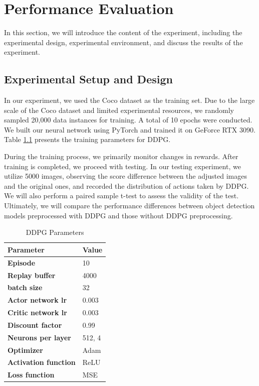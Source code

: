 \documentclass{PHlab-thesis}
\begin{document}
\chapter{Performance Evaluation}
In this section, we will introduce the content of the experiment, including the experimental design, experimental environment, and discuss the results of the experiment.

\section{Experimental Setup and Design}
In our experiment, we used the Coco dataset \cite{lin2014microsoft} as the training set. Due to the large scale of the Coco dataset and limited experimental resources, we randomly sampled 20,000 data instances for training. A total of 10 epochs were conducted. We built our neural network using PyTorch and trained it on GeForce RTX 3090. Table \ref{Fig.DDPG parameter} presents the training parameters for DDPG.

During the training process, we primarily monitor changes in rewards. After training is completed, we proceed with testing. In our testing experiment, we utilize 5000 images, observing the score difference between the adjusted images and the original ones, and recorded the distribution of actions taken by DDPG. We will also perform a paired sample t-test to assess the validity of the test. Ultimately, we will compare the performance differences between object detection models preprocessed with DDPG and those without DDPG preprocessing.

\begin{table}[H]
	\centering
	\caption{DDPG Parameters}
        \label{Fig.DDPG parameter} 
	\begin{tabular}{p{5cm}p{5cm}}
		\toprule  %
		\textbf{Parameter}   &\textbf{Value}  \\
		\midrule  %
		\textbf{Episode}    & 10 \\
		\textbf{Replay buffer} & 4000   \\
		\textbf{batch size} & 32  \\
		\textbf{Actor network lr} & 0.003  \\
		\textbf{Critic network lr}   & 0.003 \\
		\textbf{Discount factor}   & 0.99 \\
		\textbf{Neurons per layer}   & 512, 4 \\
		\textbf{Optimizer}   & Adam \\
		\textbf{Activation function}   & ReLU \\
		\textbf{Loss function}   & MSE \\
		\bottomrule %
	\end{tabular}
\end{table} 
\end{document}
